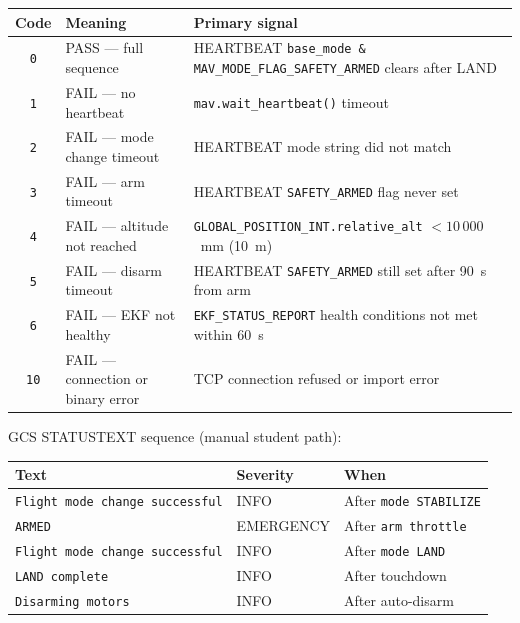 \documentclass[a4paper,11pt,twoside]{article}
\begin{document}
\begin{center}\small
\begin{tabular}{|c|p{4.0cm}|p{8.0cm}|}\hline
\textbf{Code} & \textbf{Meaning} & \textbf{Primary signal} \\ \hline
\texttt{0} & PASS --- full sequence & HEARTBEAT \texttt{base\_mode \& MAV\_MODE\_FLAG\_SAFETY\_ARMED} clears after LAND \\ \hline
\texttt{1} & FAIL --- no heartbeat & \texttt{mav.wait\_heartbeat()} timeout \\ \hline
\texttt{2} & FAIL --- mode change timeout & HEARTBEAT mode string did not match \\ \hline
\texttt{3} & FAIL --- arm timeout & HEARTBEAT \texttt{SAFETY\_ARMED} flag never set \\ \hline
\texttt{4} & FAIL --- altitude not reached & \texttt{GLOBAL\_POSITION\_INT.relative\_alt} $<10\,000$~mm (10~m) \\ \hline
\texttt{5} & FAIL --- disarm timeout & HEARTBEAT \texttt{SAFETY\_ARMED} still set after 90~s from arm \\ \hline
\texttt{6} & FAIL --- EKF not healthy & \texttt{EKF\_STATUS\_REPORT} health conditions not met within 60~s \\ \hline
\texttt{10} & FAIL --- connection or binary error & TCP connection refused or import error \\ \hline
\end{tabular}
\end{center}

GCS STATUSTEXT sequence (manual student path):

\begin{center}\small
\begin{tabular}{|p{5.5cm}|p{2.5cm}|p{6.5cm}|}\hline
\textbf{Text} & \textbf{Severity} & \textbf{When} \\ \hline
\texttt{Flight mode change successful} & INFO & After \texttt{mode STABILIZE} \\ \hline
\texttt{ARMED} & EMERGENCY & After \texttt{arm throttle} \\ \hline
\texttt{Flight mode change successful} & INFO & After \texttt{mode LAND} \\ \hline
\texttt{LAND complete} & INFO & After touchdown \\ \hline
\texttt{Disarming motors} & INFO & After auto-disarm \\ \hline
\end{tabular}
\end{center}
\end{document}
